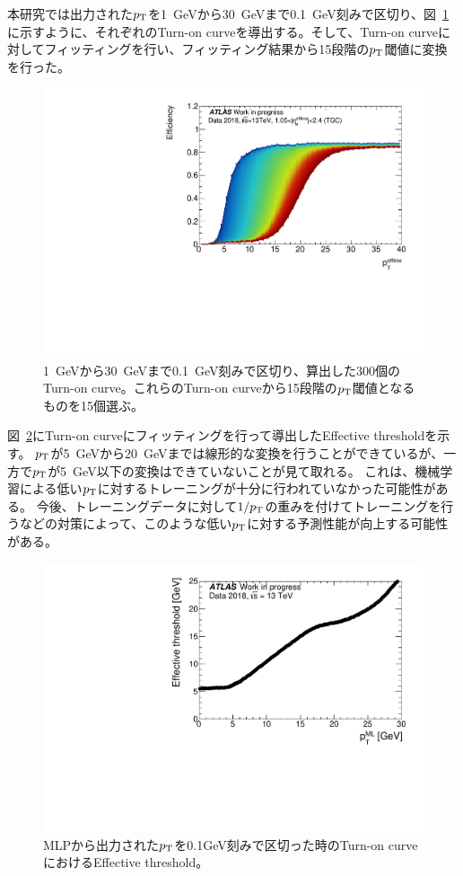 本研究では出力された$p_{\rm{T}}$を1~GeVから30~GeVまで0.1~GeV刻みで区切り、図~\ref{fig:ALL_Turn-on}に示すように、それぞれのTurn-on curveを導出する。そして、Turn-on curveに対してフィッティングを行い、フィッティング結果から15段階の$p_{\rm{T}}$閾値に変換を行った。
\begin{figure}[htb]
  \centering
  \includegraphics[clip, width=12cm]{fig/4/ALLthr_v06_Data.pdf}
  \caption{1~GeVから30~GeVまで0.1~GeV刻みで区切り、算出した300個のTurn-on curve。これらのTurn-on curveから15段階の$p_{\rm{T}}$閾値となるものを15個選ぶ。}
  \label{fig:ALL_Turn-on}
\end{figure}
図~\ref{fig:Effictive_thr_v1}にTurn-on curveにフィッティングを行って導出したEffective thresholdを示す。
$p_{\rm{T}}$が5~GeVから20~GeVまでは線形的な変換を行うことができているが、一方で$p_{\rm{T}}$が5~GeV以下の変換はできていないことが見て取れる。
これは、機械学習による低い$p_{\rm{T}}$に対するトレーニングが十分に行われていなかった可能性がある。
今後、トレーニングデータに対して${1}/{p_{\rm{T}}}$の重みを付けてトレーニングを行うなどの対策によって、このような低い$p_{\rm{T}}$に対する予測性能が向上する可能性がある。

\begin{figure}[tb]
  \centering
  \includegraphics[clip, width=12cm]{fig/5/Data_Effective.pdf}
  \caption{MLPから出力された$p_{\rm{T}}$を0.1GeV刻みで区切った時のTurn-on curveにおけるEffective threshold。}
  \label{fig:Effictive_thr_v1}
\end{figure}

